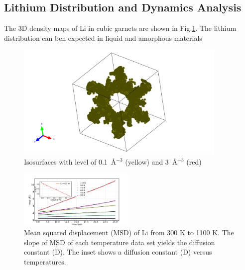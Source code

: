 \documentclass[twoside,twocolumn,9pt]{article}
\begin{document}
\subsection{Lithium Distribution and Dynamics Analysis}



The 3D density maps of Li in cubic garnets are shown in Fig.\ref{fig:pdfs}.
The lithium distribution can ben expected in liquid and amorphous materials

\begin{figure}
\centering
\includegraphics[width=0.9\textwidth]{Pics/pdfs.pdf}
\caption{Isosurfaces with level of 0.1~\AA$^{-3}$ (yellow) and 3~\AA$^{-3}$ (red)}
\label{fig:pdfs}
\end{figure}

\begin{figure}
\centering
\includegraphics[width=0.5\textwidth]{Pics/MSD.pdf}
\caption{Mean squared displacement (MSD) of Li from 300 K to 1100 K.
The slope of MSD of each temperature data set yields the diffusion constant (D).
The inset shows a diffusion constant (D) versus temperatures.}
\label{fig:msd}
\end{figure}


\end{document}
